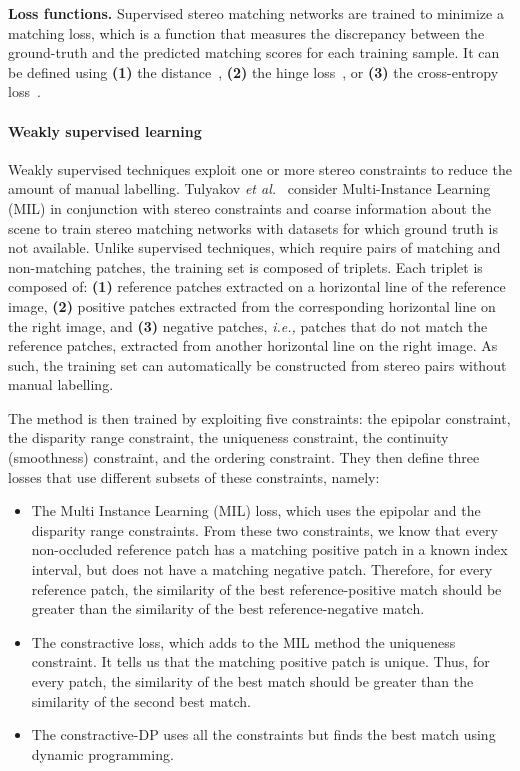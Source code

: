 \documentclass[10pt,journal,compsoc]{IEEEtran}
\newcommand{\ie}{\emph{i.e., }}
\newcommand{\etal}{\emph{et al.}}
\newcommand{\noi}{\noindent}
\begin{document}
\vspace{6pt}
\noi\textbf{Loss functions. }  Supervised stereo matching networks are trained to minimize a matching loss, which is a function that measures the discrepancy between the ground-truth and the predicted matching scores for each training sample. It can be defined using \textbf{(1) }the  distance~\cite{zbontar2016stereo,chen2015deep,shaked2017improved}, \textbf{(2)} the hinge loss~\cite{zbontar2016stereo,shaked2017improved}, or \textbf{(3)} the cross-entropy loss~\cite{luo2016efficient}.  



\paragraph{Weakly supervised learning}
\label{sec:weakly_supervisied_matching}

Weakly supervised techniques exploit one or more stereo constraints to reduce the amount of manual labelling. Tulyakov \etal~\cite{tulyakov2017weakly} consider Multi-Instance Learning (MIL) in conjunction with stereo constraints and coarse information about the scene to train stereo matching networks with datasets for which ground truth is not available. Unlike supervised techniques, which require pairs of matching and non-matching patches, the training set is composed of  triplets. Each triplet is composed of: \textbf{(1)}   reference patches extracted on a horizontal line of the reference image, \textbf{(2)}   positive patches extracted from  the corresponding horizontal line  on the right image, and \textbf{(3)}  negative patches, \ie patches that do not match the reference patches, extracted from another horizontal line on the right image.  As such, the training set can automatically be constructed from stereo pairs without manual labelling. 

The method is then trained by exploiting five constraints: the epipolar constraint, the disparity range constraint, the uniqueness constraint, the continuity (smoothness) constraint, and the ordering constraint. They then define three losses that use different subsets of these constraints, namely:
\begin{itemize}
	\item The Multi Instance Learning (MIL) loss, which uses the epipolar and the disparity range constraints.  From these two constraints, we know that every non-occluded reference patch has a matching positive patch in a known index interval, but does not have a matching negative patch. Therefore, for every reference patch, the similarity of the best reference-positive match should be greater than the similarity of the best reference-negative match.
	\item The constractive loss, which adds to the MIL method  the uniqueness constraint. It tells us that the matching positive patch is unique. Thus,  for every patch, the similarity of the best match should be greater than the similarity of the second best match.
	\item The constractive-DP   uses all the constraints  but finds the best match using dynamic programming.
\end{itemize}
\end{document}
